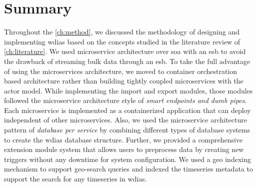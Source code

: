 \section{Summary}
\label{se:method_summary}

Throughout the \cref{ch:method}, we discussed the methodology of designing and implementing \acrshort{wdias} based on the concepts studied in the literature review of \cref{ch:literature}. We used microservice architecture over \acrshort{soa} with an \acrshort{esb} to avoid the drawback of streaming bulk data through an \acrshort{esb}. To take the full advantage of using the microservices architecture, we moved to container orchestration based architecture rather than building tightly coupled microservices with the actor model. 
While implementing the import and export modules, those modules followed the microservice architecture style of \emph{smart endpoints and dumb pipes}. Each microservice is implemented as a containerized application that can deploy independent of other microservices. Also, we used the microservice architecture pattern of \emph{database per service} by combining different types of database systems to create the \acrshort{wdias} database structure. Further, we provided a comprehensive extension module system that allows users to preprocess data by creating new triggers without any downtime for system configuration. We used a geo indexing mechanism to support geo-search queries and indexed the timeseries metadata to support the search for any timeseries in \acrshort{wdias}.
